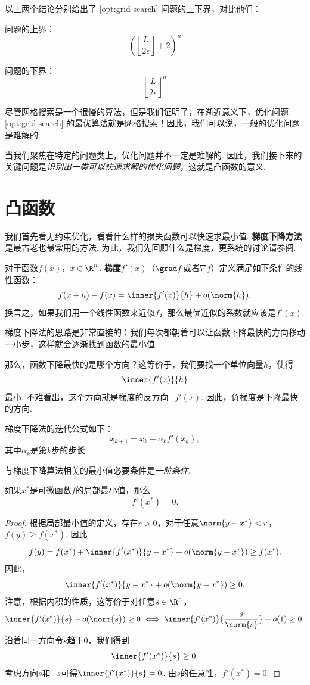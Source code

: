 以上两个结论分别给出了 \eqref{opt:grid-search} 问题的上下界，对比他们：
\begin{center}
\begin{minipage}[t]{0.4\textwidth}
问题的上界：
\[\left(\left\lfloor\frac{L}{2\epsilon}\right\rfloor+2\right)^n\]
\end{minipage}
\begin{minipage}[t]{0.4\textwidth}
问题的下界：
    \[\left\lfloor\frac{L}{2\epsilon}\right\rfloor^n\]
\end{minipage}
\end{center}
尽管网格搜索是一个很慢的算法，但是我们证明了，在渐近意义下，优化问题 \eqref{opt:grid-search} 的最优算法就是网格搜索！因此，我们可以说，一般的优化问题是难解的. 

当我们聚焦在特定的问题类上，优化问题并不一定是难解的. 因此，我们接下来的关键问题是\textit{识别出一类可以快速求解的优化问题}，这就是凸函数的意义. 


\section{凸函数}\label{sec:convex-function}

我们首先看无约束优化，看看什么样的损失函数可以快速求最小值. \textbf{梯度下降方法}是最古老也最常用的方法. 为此，我们先回顾什么是梯度，更系统的讨论请参阅.

对于函数$f(x)$，$x\in\R^n$. \textbf{梯度}$f'(x)$（$\grad f$或者$\nabla f$）定义满足如下条件的线性函数：
    \[f(x+h)-f(x)=\inner{f'(x)}{h}+o(\norm{h}).\]
换言之，如果我们用一个线性函数来近似$f$，那么最优近似的系数就应该是$f'(x)$.

梯度下降法的思路是非常直接的：我们每次都朝着可以让函数下降最快的方向移动一小步，这样就会逐渐找到函数的最小值. 

那么，函数下降最快的是哪个方向？这等价于，我们要找一个单位向量$h$，使得
\[\inner{f'(x)}{h}\]
最小. 不难看出，这个方向就是梯度的反方向$-f'(x)$. 因此，负梯度是下降最快的方向. 

梯度下降法的迭代公式如下：
\[x_{k+1}=x_k-\alpha_k f'(x_k),\]
其中$\alpha_k$是第$k$步的\textbf{步长}. 

与梯度下降算法相关的最小值必要条件是\emph{一阶条件}. 

\begin{theorem}[一阶条件]\label{thm:first-order-condition}
    如果$x^*$是可微函数$f$的局部最小值，那么
    \[f'(x^*)=0.\]
\end{theorem}

\begin{proof}
根据局部最小值的定义，存在$r>0$，对于任意$\norm{y-x^*}<r$，$f(y)\geq f(x^*)$. 因此
\[f(y)=f(x^*)+\inner{f'(x^*)}{y-x^*}+o(\norm{y-x^*})\geq f(x^*).\]
因此，
\[\inner{f'(x^*)}{y-x^*}+o(\norm{y-x^*})\geq 0.\]
注意，根据内积的性质，这等价于对任意$s\in\R^n$，
\[\inner{f'(x^*)}{s}+o(\norm{s})\geq 0\iff \inner{f'(x^*)}{\frac{s}{\norm{s}}}+o(1)\geq 0.\]
沿着同一方向令$s$趋于$0$，我们得到
\[\inner{f'(x^*)}{s}\geq 0.\]
考虑方向$s$和$-s$可得$\inner{f'(x^*)}{s}=0$. 由$s$的任意性，$f'(x^*)=0$.
\end{proof}

